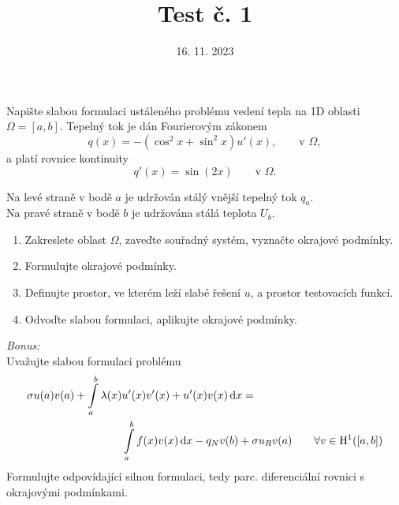 \documentclass{article}
\def\d{{\rm{d}}}
\begin{document}
\title{Test č. 1}
\date{16. 11. 2023}
\author{}
\maketitle


\noindent

Napište slabou formulaci ustáleného problému vedení tepla na 1D oblasti $\Omega=[a,b]$.
Tepelný tok je dán Fourierovým zákonem
\[
    q(x) = -(\cos^2x+\sin^2x)u'(x), \qquad \textrm{v }\Omega,
\]
a platí rovnice kontinuity
\[
    q'(x) = \sin(2x) \qquad \textrm{v }\Omega.
\]

\noindent
Na levé straně v bodě $a$ je udržován stálý vnější tepelný tok $q_a$.\\
Na pravé straně v bodě $b$ je udržována stálá teplota $U_b$.

\begin{enumerate}
\item Zakreslete oblast $\Omega$, zaveďte souřadný systém, vyznačte okrajové podmínky.
\item Formulujte okrajové podmínky.
\item Definujte prostor, ve kterém leží slabé řešení $u$, a prostor testovacích funkcí.
\item Odvoďte slabou formulaci, aplikujte okrajové podmínky.
\end{enumerate}


\vspace{2cm}
\emph{Bonus:}\\
Uvažujte slabou formulaci problému
\begin{align*}
    \sigma u(a)v(a) + \int\limits_{a}^{b} \lambda(x) & u'(x)v'(x) + u'(x)v(x) \,\d x = \\
        &\int\limits_{a}^{b} f(x)v(x) \,\d x - q_Nv(b) + \sigma u_R v(a) \qquad \forall v\in \mathrm{H}^1([a,b])
\end{align*}
Formulujte odpovídající silnou formulaci, tedy parc. diferenciální rovnici s okrajovými podmínkami.
\end{document}
